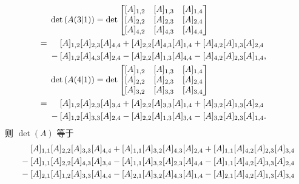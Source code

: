 \documentclass[../libro.tex]{subfiles}
\begin{document}
\begin{example}
\begin{align*}
        \\
        &
        \det {(A(3|1))}
        = \det {
            \begin{bmatrix}
                [A]_{1,2} & [A]_{1,3} & [A]_{1,4} \\
                [A]_{2,2} & [A]_{2,3} & [A]_{2,4} \\
                [A]_{4,2} & [A]_{4,3} & [A]_{4,4} \\
            \end{bmatrix}
        }
        \\
        = {} &
        \hphantom{{} + {}}
        [A]_{1,2} [A]_{2,3} [A]_{4,4}
        + [A]_{2,2} [A]_{4,3} [A]_{1,4}
        + [A]_{4,2} [A]_{1,3} [A]_{2,4}
        \\
        &
        - [A]_{1,2} [A]_{4,3} [A]_{2,4}
        - [A]_{2,2} [A]_{1,3} [A]_{4,4}
        - [A]_{4,2} [A]_{2,3} [A]_{1,4},
        \\
        &
        \det {(A(4|1))}
        = \det {
            \begin{bmatrix}
                [A]_{1,2} & [A]_{1,3} & [A]_{1,4} \\
                [A]_{2,2} & [A]_{2,3} & [A]_{2,4} \\
                [A]_{3,2} & [A]_{3,3} & [A]_{3,4} \\
            \end{bmatrix}
        }
        \\
        = {} &
        \hphantom{{} + {}}
        [A]_{1,2} [A]_{2,3} [A]_{3,4}
        + [A]_{2,2} [A]_{3,3} [A]_{1,4}
        + [A]_{3,2} [A]_{1,3} [A]_{2,4}
        \\
        &
        - [A]_{1,2} [A]_{3,3} [A]_{2,4}
        - [A]_{2,2} [A]_{1,3} [A]_{3,4}
        - [A]_{3,2} [A]_{2,3} [A]_{1,4}.
    \end{align*}
    则 \(\det {(A)}\) 等于
    \begin{align*}
        & \hphantom{{} + {}}
        [A]_{1,1} [A]_{2,2} [A]_{3,3} [A]_{4,4}
        + [A]_{1,1} [A]_{3,2} [A]_{4,3} [A]_{2,4}
        + [A]_{1,1} [A]_{4,2} [A]_{2,3} [A]_{3,4}
        \\
        &
        - [A]_{1,1} [A]_{2,2} [A]_{4,3} [A]_{3,4}
        - [A]_{1,1} [A]_{3,2} [A]_{2,3} [A]_{4,4}
        - [A]_{1,1} [A]_{4,2} [A]_{3,3} [A]_{2,4}
        \\
        &
        - [A]_{2,1} [A]_{1,2} [A]_{3,3} [A]_{4,4}
        - [A]_{2,1} [A]_{3,2} [A]_{4,3} [A]_{1,4}
        - [A]_{2,1} [A]_{4,2} [A]_{1,3} [A]_{3,4}
        \\

\end{align*}
\end{example}
\end{document}
